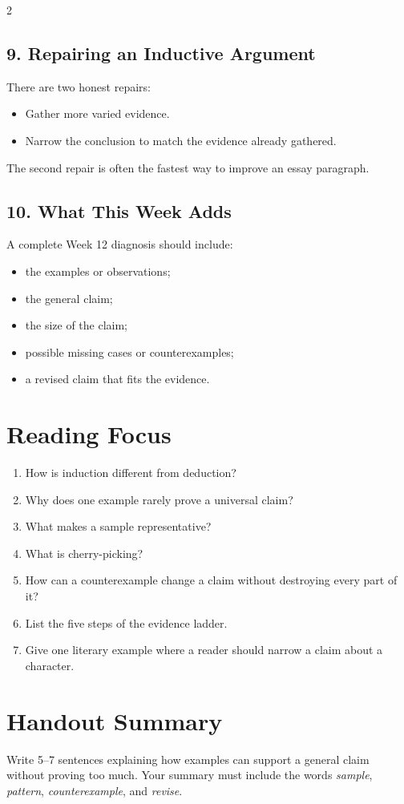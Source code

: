 \documentclass[12pt]{article}
\begin{document}
\begin{multicols}{2}
\subsection*{9. Repairing an Inductive Argument}
There are two honest repairs:
\begin{itemize}[leftmargin=*]
\item Gather more varied evidence.
\item Narrow the conclusion to match the evidence already gathered.
\end{itemize}
The second repair is often the fastest way to improve an essay paragraph.

\subsection*{10. What This Week Adds}
A complete Week 12 diagnosis should include:
\begin{itemize}[leftmargin=*,itemsep=0.12em]
\item the examples or observations;
\item the general claim;
\item the size of the claim;
\item possible missing cases or counterexamples;
\item a revised claim that fits the evidence.
\end{itemize}

\section*{Reading Focus}
\begin{enumerate}[leftmargin=*]
\item How is induction different from deduction?
\item Why does one example rarely prove a universal claim?
\item What makes a sample representative?
\item What is cherry-picking?
\item How can a counterexample change a claim without destroying every part of it?
\item List the five steps of the evidence ladder.
\item Give one literary example where a reader should narrow a claim about a character.
\end{enumerate}

\section*{Handout Summary}
Write 5--7 sentences explaining how examples can support a general claim without proving too much. Your summary must include the words \textit{sample}, \textit{pattern}, \textit{counterexample}, and \textit{revise}.
\end{multicols}
\end{document}
